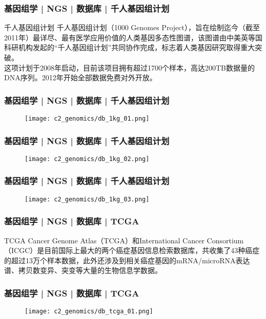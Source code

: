 \begin{frame}
  \frametitle{基因组学 | NGS | 数据库 | 千人基因组计划}
  \begin{block}{千人基因组计划}
千人基因组计划（1000 Genomes Project），旨在绘制迄今（截至2011年）最详尽、最有医学应用价值的人类基因多态性图谱，该图谱由中美英等国科研机构发起的“千人基因组计划”共同协作完成，标志着人类基因研究取得重大突破。\\
\vspace{1em}
这项计划于2008年启动，目前该项目拥有超过1700个样本，高达200TB数据量的DNA序列。2012年开始全部数据免费对外开放。
  \end{block}
\end{frame}
    
\begin{frame}
  \frametitle{基因组学 | NGS | 数据库 | 千人基因组计划}
  \begin{figure}
    \centering
    \texttt{[image: c2\_genomics/db\_1kg\_01.png]}
  \end{figure}
\end{frame}
    
\begin{frame}
  \frametitle{基因组学 | NGS | 数据库 | 千人基因组计划}
  \begin{figure}
    \centering
    \texttt{[image: c2\_genomics/db\_1kg\_02.png]}
  \end{figure}
\end{frame}
    
\begin{frame}
  \frametitle{基因组学 | NGS | 数据库 | 千人基因组计划}
  \begin{figure}
    \centering
    \texttt{[image: c2\_genomics/db\_1kg\_03.png]}
  \end{figure}
\end{frame}
    
\begin{frame}
  \frametitle{基因组学 | NGS | 数据库 | TCGA}
  \begin{block}{TCGA}
Cancer Genome Atlas（TCGA）和International Cancer Consortium（ICGC）是目前国际上最大的两个癌症基因信息检索数据库，共收集了43种癌症的超过13万个样本数据，此外还涉及到相关癌症基因的mRNA/microRNA表达谱、拷贝数变异、突变等大量的生物信息学数据。
  \end{block}
\end{frame}

\begin{frame}
  \frametitle{基因组学 | NGS | 数据库 | TCGA}
  \begin{figure}
    \centering
    \texttt{[image: c2\_genomics/db\_tcga\_01.png]}
  \end{figure}
\end{frame}
    
